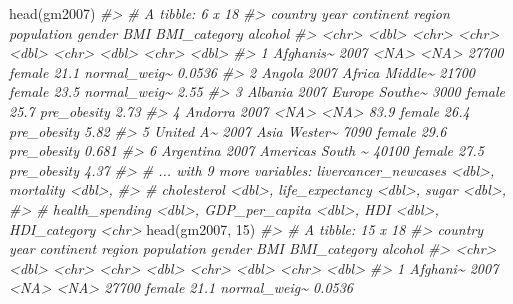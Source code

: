 \documentclass[
]{book}
\newenvironment{Shaded}{\begin{snugshade}}{\end{snugshade}}
\newcommand{\CommentTok}[1]{\textcolor[rgb]{0.56,0.35,0.01}{\textit{#1}}}
\newcommand{\DecValTok}[1]{\textcolor[rgb]{0.00,0.00,0.81}{#1}}
\newcommand{\FunctionTok}[1]{\textcolor[rgb]{0.00,0.00,0.00}{#1}}
\newcommand{\NormalTok}[1]{#1}
\begin{document}
\begin{Shaded}
\begin{Highlighting}[]
\FunctionTok{head}\NormalTok{(gm2007)}
\CommentTok{\#\textgreater{} \# A tibble: 6 x 18}
\CommentTok{\#\textgreater{}   country    year continent region  population gender   BMI BMI\_category alcohol}
\CommentTok{\#\textgreater{}   \textless{}chr\textgreater{}     \textless{}dbl\textgreater{} \textless{}chr\textgreater{}     \textless{}chr\textgreater{}        \textless{}dbl\textgreater{} \textless{}chr\textgreater{}  \textless{}dbl\textgreater{} \textless{}chr\textgreater{}          \textless{}dbl\textgreater{}}
\CommentTok{\#\textgreater{} 1 Afghanis\textasciitilde{}  2007 \textless{}NA\textgreater{}      \textless{}NA\textgreater{}       27700   female  21.1 normal\_weig\textasciitilde{}  0.0536}
\CommentTok{\#\textgreater{} 2 Angola     2007 Africa    Middle\textasciitilde{}    21700   female  23.5 normal\_weig\textasciitilde{}  2.55  }
\CommentTok{\#\textgreater{} 3 Albania    2007 Europe    Southe\textasciitilde{}     3000   female  25.7 pre\_obesity   2.73  }
\CommentTok{\#\textgreater{} 4 Andorra    2007 \textless{}NA\textgreater{}      \textless{}NA\textgreater{}          83.9 female  26.4 pre\_obesity   5.82  }
\CommentTok{\#\textgreater{} 5 United A\textasciitilde{}  2007 Asia      Wester\textasciitilde{}     7090   female  29.6 pre\_obesity   0.681 }
\CommentTok{\#\textgreater{} 6 Argentina  2007 Americas  South \textasciitilde{}    40100   female  27.5 pre\_obesity   4.37  }
\CommentTok{\#\textgreater{} \# ... with 9 more variables: livercancer\_newcases \textless{}dbl\textgreater{}, mortality \textless{}dbl\textgreater{},}
\CommentTok{\#\textgreater{} \#   cholesterol \textless{}dbl\textgreater{}, life\_expectancy \textless{}dbl\textgreater{}, sugar \textless{}dbl\textgreater{},}
\CommentTok{\#\textgreater{} \#   health\_spending \textless{}dbl\textgreater{}, GDP\_per\_capita \textless{}dbl\textgreater{}, HDI \textless{}dbl\textgreater{}, HDI\_category \textless{}chr\textgreater{}}
\FunctionTok{head}\NormalTok{(gm2007, }\DecValTok{15}\NormalTok{)}
\CommentTok{\#\textgreater{} \# A tibble: 15 x 18}
\CommentTok{\#\textgreater{}    country   year continent region  population gender   BMI BMI\_category alcohol}
\CommentTok{\#\textgreater{}    \textless{}chr\textgreater{}    \textless{}dbl\textgreater{} \textless{}chr\textgreater{}     \textless{}chr\textgreater{}        \textless{}dbl\textgreater{} \textless{}chr\textgreater{}  \textless{}dbl\textgreater{} \textless{}chr\textgreater{}          \textless{}dbl\textgreater{}}
\CommentTok{\#\textgreater{}  1 Afghani\textasciitilde{}  2007 \textless{}NA\textgreater{}      \textless{}NA\textgreater{}       27700   female  21.1 normal\_weig\textasciitilde{}  0.0536}

\end{Highlighting}
\end{Shaded}
\end{document}

